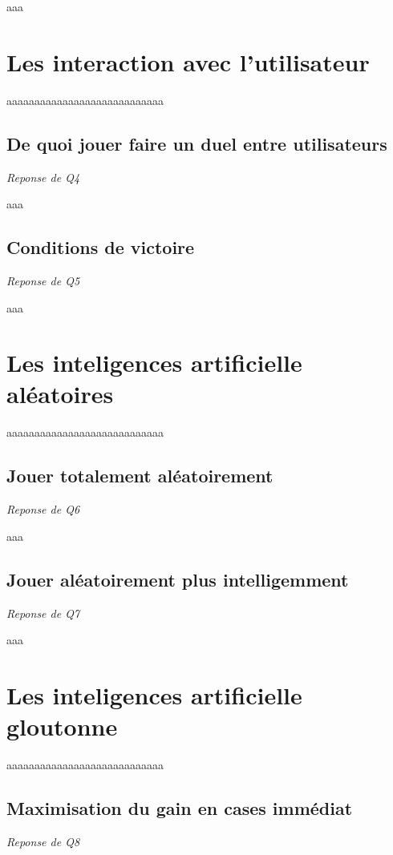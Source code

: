 \documentclass[a4paper,11pt]{article}
\begin{document}
aaa




\section{Les interaction avec l'utilisateur}

aaaaaaaaaaaaaaaaaaaaaaaaaaaa


\subsection{De quoi jouer faire un duel entre utilisateurs}
\emph{Reponse de Q4}

aaa

\subsection{Conditions de victoire}
\emph{Reponse de Q5}

aaa


\section{Les inteligences artificielle aléatoires}

aaaaaaaaaaaaaaaaaaaaaaaaaaaa


\subsection{Jouer totalement aléatoirement}
\emph{Reponse de Q6}

aaa

\subsection{Jouer aléatoirement plus intelligemment}
\emph{Reponse de Q7}

aaa


\section{Les inteligences artificielle gloutonne}

aaaaaaaaaaaaaaaaaaaaaaaaaaaa


\subsection{Maximisation du gain en cases immédiat}
\emph{Reponse de Q8}
\end{document}
